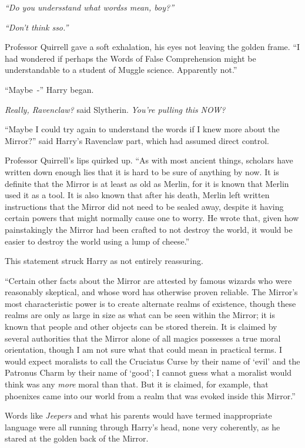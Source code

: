 \emph{``Do you undersstand what wordss mean, boy?''}

\emph{``Don't think sso.''}

Professor Quirrell gave a soft exhalation, his eyes not leaving the golden frame. ``I had wondered if perhaps the Words of False Comprehension might be understandable to a student of Muggle science. Apparently not.''

``Maybe~-'' Harry began.

\emph{Really, Ravenclaw?} said Slytherin. \emph{You're pulling this} \emph{NOW?}

``Maybe I could try again to understand the words if I knew more about the Mirror?'' said Harry's Ravenclaw part, which had assumed direct control.

Professor Quirrell's lips quirked up. ``As with most ancient things, scholars have written down enough lies that it is hard to be sure of anything by now. It is definite that the Mirror is at least as old as Merlin, for it is known that Merlin used it as a tool. It is also known that after his death, Merlin left written instructions that the Mirror did not need to be sealed away, despite it having certain powers that might normally cause one to worry. He wrote that, given how painstakingly the Mirror had been crafted to not destroy the world, it would be easier to destroy the world using a lump of cheese.''

This statement struck Harry as not entirely reassuring.

``Certain other facts about the Mirror are attested by famous wizards who were reasonably skeptical, and whose word has otherwise proven reliable. The Mirror's most characteristic power is to create alternate realms of existence, though these realms are only as large in size as what can be seen within the Mirror; it is known that people and other objects can be stored therein. It is claimed by several authorities that the Mirror alone of all magics possesses a true moral orientation, though I am not sure what that could mean in practical terms. I would expect moralists to call the Cruciatus Curse by their name of `evil' and the Patronus Charm by their name of `good'; I cannot guess what a moralist would think was any \emph{more} moral than that. But it is claimed, for example, that phoenixes came into our world from a realm that was evoked inside this Mirror.''

Words like \emph{Jeepers} and what his parents would have termed inappropriate language were all running through Harry's head, none very coherently, as he stared at the golden back of the Mirror.

